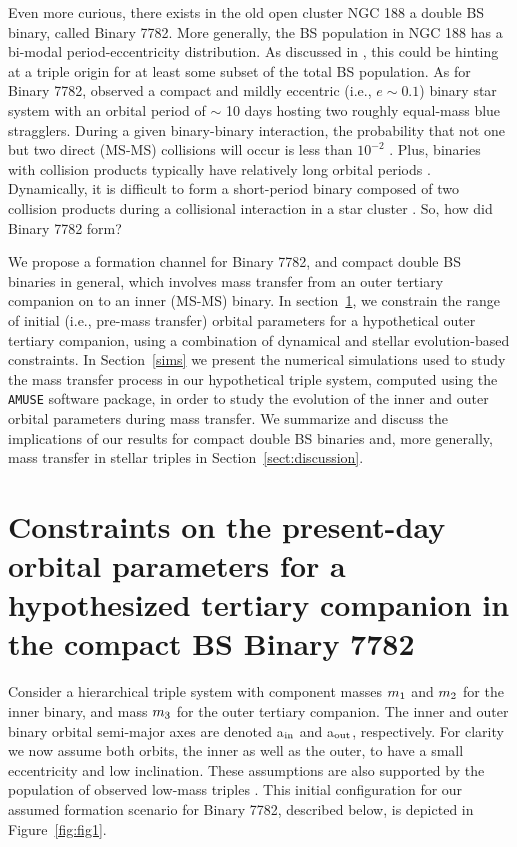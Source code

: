 \documentclass{aastex62}
\begin{document}
Even more curious, there exists in the old open cluster NGC 188 a
double BS binary, called Binary 7782.  More generally, the BS
population in NGC 188 has a bi-modal period-eccentricity distribution.
As discussed in \citet{leigh11}, this could be hinting at a triple
origin for at least some subset of the total BS population.  As for
Binary 7782, \citet{mathieu09} observed a compact and mildly eccentric
(i.e., $e \sim 0.1$) binary star system with an orbital period of
$\sim$ 10 days hosting two roughly equal-mass blue stragglers.  During
a given binary-binary interaction, the probability that not one but
two direct (MS-MS) collisions will occur is less than $10^{-2}$
\citep{leonard89,leigh11,leigh12}.  Plus, binaries with collision products
typically have relatively long orbital periods
\cite{2011Sci...334.1380F}. Dynamically, it is difficult to form a
short-period binary composed of two collision products during a
collisional interaction in a star cluster \citep{2011Sci...334.1380F}.
So, how did Binary 7782 form?

We propose a formation channel for Binary 7782, and compact double BS
binaries in general, which involves mass transfer from an outer
tertiary companion on to an inner (MS-MS) binary.  In
section~\ref{sect:dyn}, we constrain the range of initial (i.e., pre-mass
transfer) orbital parameters for a hypothetical outer tertiary
companion, using a combination of dynamical and stellar
evolution-based constraints.  In Section~\ref{sims} we present the
numerical simulations used to study the mass transfer process in our
hypothetical triple system, computed using the
\texttt{AMUSE}\cite{AMUSE} software package, in order to study the
evolution of the inner and outer orbital parameters during mass
transfer.  We summarize and discuss the implications of our results
for compact double BS binaries and, more generally, mass transfer in
stellar triples in Section~\ref{sect:discussion}.

\section{Constraints on the present-day orbital parameters for a hypothesized
         tertiary companion in the compact BS Binary 7782} \label{sect:dyn}

Consider a hierarchical triple system with component masses $m_{\rm
  1}$ and $m_{\rm 2}$ for the inner binary, and mass $m_{\rm 3}$ for
the outer tertiary companion.  The inner and outer binary orbital
semi-major axes are denoted a$_{\rm in}$ and a$_{\rm out}$,
respectively.  For clarity we now assume both orbits, the inner as
well as the outer, to have a small eccentricity and low inclination.
These assumptions are also supported by the population of observed
low-mass triples \cite{2010yCat..73890925T,moe18}.  This initial
configuration for our assumed formation scenario for Binary 7782,
described below, is depicted in Figure~\ref{fig:fig1}.
\end{document}
